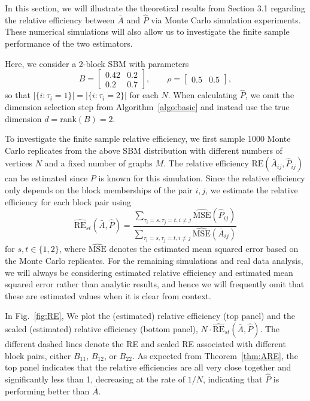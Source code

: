 \documentclass[10pt,letterpaper]{article}
\renewcommand{\hat}{\widehat}
\begin{document}
In this section, we will illustrate the theoretical results from Section 3.1 regarding the relative efficiency between $\bar{A}$ and $\hat{P}$ via Monte Carlo simulation experiments.
These numerical simulations will also allow us to investigate the finite sample performance of the two estimators.

Here, we consider a 2-block SBM with parameters
\begin{equation*}
B = \begin{bmatrix}
0.42 & 0.2 \\
0.2 & 0.7
\end{bmatrix}
,\qquad \rho = \begin{bmatrix}
0.5 & 0.5
\end{bmatrix},
\end{equation*}
so that $|\{i:\tau_i=1\}|=|\{i:\tau_i=2\}|$ for each $N$.
When calculating $\hat{P}$, we omit the dimension selection step from Algorithm~\ref{algo:basic} and instead use the true dimension $d = \mathrm{rank}(B) = 2$.

To investigate the finite sample relative efficiency, we first sample 1000 Monte Carlo replicates from the above SBM distribution with different numbers of vertices $N$ and a fixed number of graphs $M$. The  relative efficiency $\mathrm{RE}(\bar{A}_{ij}, \hat{P}_{ij})$ can be estimated since $P$ is known for this simulation. Since the relative efficiency only depends on the block memberships of the pair $i,j$, we estimate the relative efficiency for each block pair using
\[
    \hat{\mathrm{RE}}_{st}(\bar{A},\hat{P}) = \frac{\sum_{\tau_i=s,\tau_j=t,i \ne j} \hat{\mathrm{MSE}}(\hat{P}_{ij})}{\sum_{\tau_i=s,\tau_j=t,i \ne j} \hat{\mathrm{MSE}}(\bar{A}_{ij})}
\]
for $s,t\in\{1,2\}$, where $\hat{\mathrm{MSE}}$ denotes the estimated mean squared error based on the Monte Carlo replicates.
For the remaining simulations and real data analysis, we will always be considering estimated relative efficiency and estimated mean squared error rather than analytic results, and hence we will frequently omit that these are estimated values when it is clear from context.

In Fig.~\ref{fig:RE}, We plot the (estimated) relative efficiency (top panel) and the scaled (estimated) relative efficiency (bottom panel), $N \cdot \hat{\mathrm{RE}}_{st}(\bar{A},\hat{P})$.
The different dashed lines denote the RE and scaled RE associated with different block pairs, either $B_{11}$, $B_{12}$, or $B_{22}$. 
As expected from Theorem~\ref{thm:ARE}, the top panel indicates that the relative efficiencies are all very close together and significantly less than 1, decreasing at the rate of $1/N$, indicating that $\hat{P}$ is performing better than $\bar{A}$.
\end{document}
